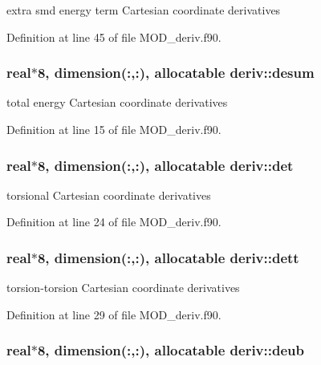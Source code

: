 extra smd energy term Cartesian coordinate derivatives 



Definition at line 45 of file M\-O\-D\-\_\-deriv.\-f90.

\hypertarget{classderiv_ad23bdcc166a23b3529b9daef17b14260}{
\subsubsection[{desum}]{\setlength{\rightskip}{0pt plus 5cm}real$\ast$8, dimension(\-:,\-:), allocatable deriv\-::desum}}\label{classderiv_ad23bdcc166a23b3529b9daef17b14260}


total energy Cartesian coordinate derivatives 



Definition at line 15 of file M\-O\-D\-\_\-deriv.\-f90.

\hypertarget{classderiv_a6080bc7632418716603f5fe338fffd26}{
\subsubsection[{det}]{\setlength{\rightskip}{0pt plus 5cm}real$\ast$8, dimension(\-:,\-:), allocatable deriv\-::det}}\label{classderiv_a6080bc7632418716603f5fe338fffd26}


torsional Cartesian coordinate derivatives 



Definition at line 24 of file M\-O\-D\-\_\-deriv.\-f90.

\hypertarget{classderiv_ae4cc6fb1e2dc67a34d2b42b76478ddcb}{
\subsubsection[{dett}]{\setlength{\rightskip}{0pt plus 5cm}real$\ast$8, dimension(\-:,\-:), allocatable deriv\-::dett}}\label{classderiv_ae4cc6fb1e2dc67a34d2b42b76478ddcb}


torsion-\/torsion Cartesian coordinate derivatives 



Definition at line 29 of file M\-O\-D\-\_\-deriv.\-f90.

\hypertarget{classderiv_aba3704a824a9def0252571907bc6d11e}{
\subsubsection[{deub}]{\setlength{\rightskip}{0pt plus 5cm}real$\ast$8, dimension(\-:,\-:), allocatable deriv\-::deub}}\label{classderiv_aba3704a824a9def0252571907bc6d11e}


